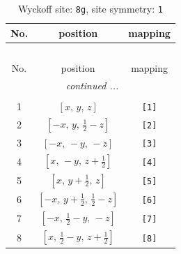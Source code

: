 \documentclass[fleqn,8pt]{jsarticle}
\begin{document}
\renewcommand{\arraystretch}{1.2}
\begin{longtable}{ccc}
\caption{Wyckoff site: {\tt 8g}, site symmetry: {\tt 1}}
 \\
 \hline \hline
No. & position & mapping \\ \hline \endfirsthead

\multicolumn{2}{l}{\tablename\ \thetable{}} \\
 \hline \hline
No. & position & mapping \\ \hline \endhead

 \hline \hline
\multicolumn{2}{r}{\footnotesize\it continued ...} \\ \endfoot

 \hline \hline
\multicolumn{2}{r}{} \\ \endlastfoot

1 & $\left[ x,\, y,\, z \right]$ & {\tt [1]} \\ \hline
2 & $\left[ - x,\, y,\, \frac{1}{2} - z \right]$ & {\tt [2]} \\ \hline
3 & $\left[ - x,\, - y,\, - z \right]$ & {\tt [3]} \\ \hline
4 & $\left[ x,\, - y,\, z + \frac{1}{2} \right]$ & {\tt [4]} \\ \hline
5 & $\left[ x,\, y + \frac{1}{2},\, z \right]$ & {\tt [5]} \\ \hline
6 & $\left[ - x,\, y + \frac{1}{2},\, \frac{1}{2} - z \right]$ & {\tt [6]} \\ \hline
7 & $\left[ - x,\, \frac{1}{2} - y,\, - z \right]$ & {\tt [7]} \\ \hline
8 & $\left[ x,\, \frac{1}{2} - y,\, z + \frac{1}{2} \right]$ & {\tt [8]} \\
\end{longtable}
\end{document}
